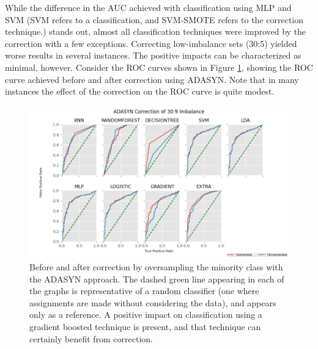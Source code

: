 \documentclass[letterpaper, notitlepage]{report}
\begin{document}
While the difference in the AUC achieved with classification using MLP and SVM (SVM refers to a classification, and SVM-SMOTE refers to the correction technique.) stands out, almost all classification techniques were improved by the correction with a few exceptions. Correcting low-imbalance sets (30:5) yielded worse results in several instances. The positive impacts can be characterized as minimal, however. Consider the ROC curves shown in Figure \ref{fig:auc}, showing the ROC curve achieved before and after correction using ADASYN. Note that in many instances the effect of the correction on the ROC curve is quite modest.

\begin{figure}[H]
	\centering
	\includegraphics[height=0.40\textheight]{figures/roc-corrected.png}
	\caption[Before and after correction]{Before and after correction by oversampling the minority class with the ADASYN approach. The dashed green line appearing in each of the graphs is representative of a random classifier (one where assignments are made without considering the data), and appears only as a reference. A positive impact on classification using a gradient boosted technique is present, and that technique can certainly benefit from correction. }
	\label{fig:auc}
\end{figure}
\end{document}
